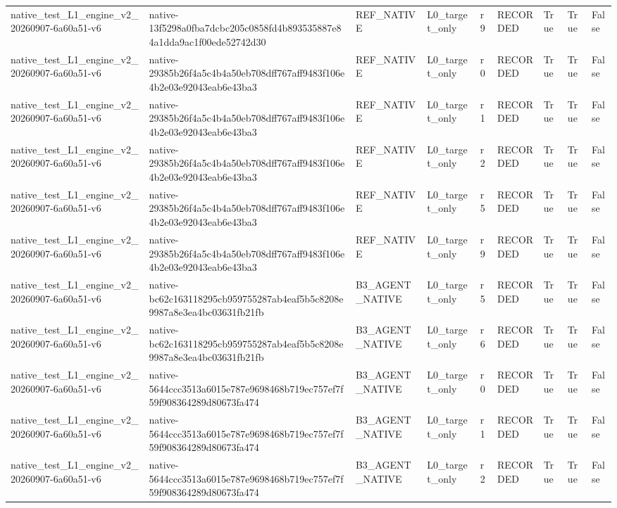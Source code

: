 \begin{tabular}{lllllllll}
native\_test\_L1\_engine\_v2\_20260907-6a60a51-v6 & native-13f5298a0fba7dcbc205c0858fd4b893535887e84a1dda9ac1f00ede52742d30 & REF\_NATIVE & L0\_target\_only & r9 & RECORDED & True & True & False \\
native\_test\_L1\_engine\_v2\_20260907-6a60a51-v6 & native-29385b26f4a5c4b4a50eb708dff767aff9483f106e4b2e03e92043eab6e43ba3 & REF\_NATIVE & L0\_target\_only & r0 & RECORDED & True & True & False \\
native\_test\_L1\_engine\_v2\_20260907-6a60a51-v6 & native-29385b26f4a5c4b4a50eb708dff767aff9483f106e4b2e03e92043eab6e43ba3 & REF\_NATIVE & L0\_target\_only & r1 & RECORDED & True & True & False \\
native\_test\_L1\_engine\_v2\_20260907-6a60a51-v6 & native-29385b26f4a5c4b4a50eb708dff767aff9483f106e4b2e03e92043eab6e43ba3 & REF\_NATIVE & L0\_target\_only & r2 & RECORDED & True & True & False \\
native\_test\_L1\_engine\_v2\_20260907-6a60a51-v6 & native-29385b26f4a5c4b4a50eb708dff767aff9483f106e4b2e03e92043eab6e43ba3 & REF\_NATIVE & L0\_target\_only & r5 & RECORDED & True & True & False \\
native\_test\_L1\_engine\_v2\_20260907-6a60a51-v6 & native-29385b26f4a5c4b4a50eb708dff767aff9483f106e4b2e03e92043eab6e43ba3 & REF\_NATIVE & L0\_target\_only & r9 & RECORDED & True & True & False \\
native\_test\_L1\_engine\_v2\_20260907-6a60a51-v6 & native-bc62c163118295cb959755287ab4eaf5b5c8208e9987a8e3ea4bc03631fb21fb & B3\_AGENT\_NATIVE & L0\_target\_only & r5 & RECORDED & True & True & False \\
native\_test\_L1\_engine\_v2\_20260907-6a60a51-v6 & native-bc62c163118295cb959755287ab4eaf5b5c8208e9987a8e3ea4bc03631fb21fb & B3\_AGENT\_NATIVE & L0\_target\_only & r6 & RECORDED & True & True & False \\
native\_test\_L1\_engine\_v2\_20260907-6a60a51-v6 & native-5644ccc3513a6015e787e9698468b719ec757ef7f59f908364289d80673fa474 & B3\_AGENT\_NATIVE & L0\_target\_only & r0 & RECORDED & True & True & False \\
native\_test\_L1\_engine\_v2\_20260907-6a60a51-v6 & native-5644ccc3513a6015e787e9698468b719ec757ef7f59f908364289d80673fa474 & B3\_AGENT\_NATIVE & L0\_target\_only & r1 & RECORDED & True & True & False \\
native\_test\_L1\_engine\_v2\_20260907-6a60a51-v6 & native-5644ccc3513a6015e787e9698468b719ec757ef7f59f908364289d80673fa474 & B3\_AGENT\_NATIVE & L0\_target\_only & r2 & RECORDED & True & True & False \\

\end{tabular}
